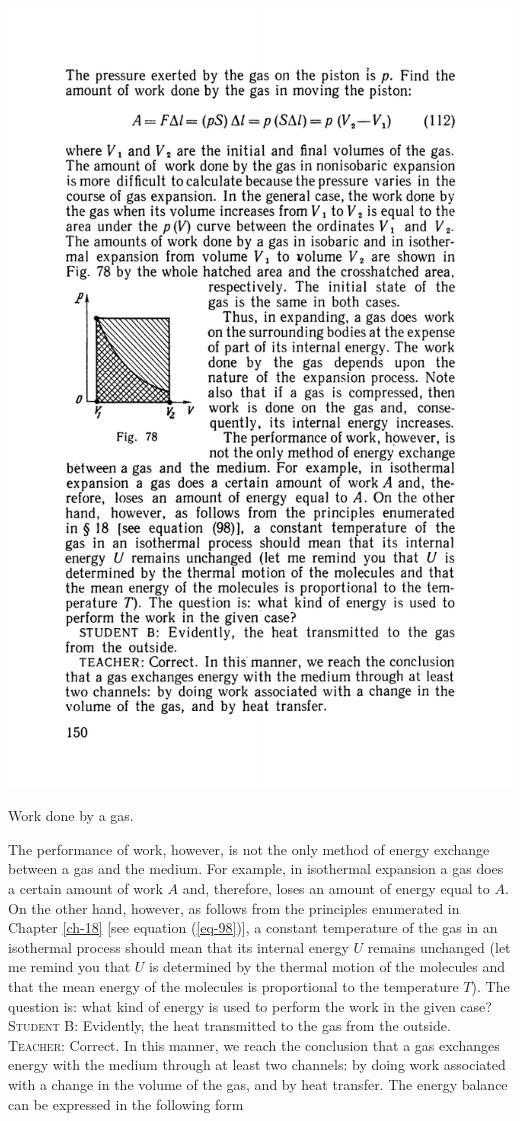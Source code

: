 \documentclass[a4paper,sfsidenotes]{tufte-book}
\begin{document}
\begin{marginfigure}%
\centering
\includegraphics[width=\linewidth]{fig-078a}
\caption{Work done by a gas.}
\label{fig-78}
\end{marginfigure}

The performance of work, however, is not the only method of energy exchange between a gas and the medium. For example, in isothermal expansion a gas does a certain amount of work $A$ and, therefore, loses an amount of energy equal to $A$. On the other hand, however, as follows from the principles enumerated in Chapter \ref{ch-18} [see equation (\ref{eq-98})], a constant temperature of the gas in an isothermal process should mean that its internal energy $U$ remains unchanged (let me remind you that $U$ is determined by the thermal motion of the molecules and that the mean energy of the molecules is proportional to the temperature $T$). The question is: what kind of energy is used to perform the work in the given case?
\\
\textsc{Student B:} Evidently, the heat transmitted to the gas from the outside.
\\
\textsc{Teacher:} Correct. In this manner, we reach the conclusion that a gas exchanges energy with the medium through at least two channels: by doing work associated with a change in the volume of the gas, and by heat transfer. The energy balance can be expressed in the following form
\end{document}
